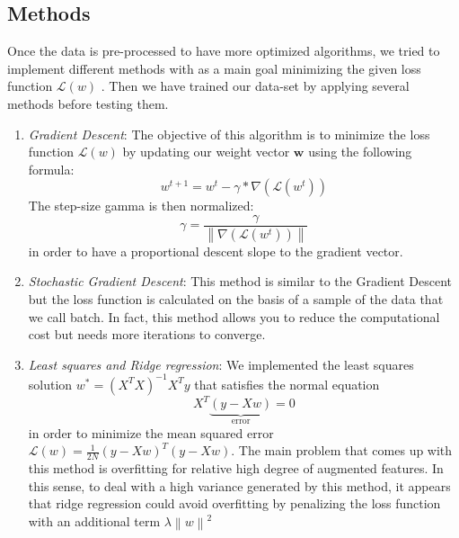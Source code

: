 \documentclass[10pt,conference,compsocconf]{IEEEtran}
\begin{document}
\subsection{Methods}
Once the data is pre-processed to have more optimized algorithms, we tried to implement different methods with as a main goal minimizing the given loss function \( \mathcal{L}( w ) \) .
Then we have trained our data-set by applying several methods before testing them.
\begin{enumerate}
\item  \textit{Gradient Descent}: The objective of this algorithm is to minimize the loss function \( \mathcal{L}( w ) \) by updating our weight vector \( \textbf{w} \) using the following formula: 
\begin{equation}
    w^{t+1} = w^{t} - \gamma*\nabla(\mathcal{L}( w^{t} )) 
\end{equation}
The step-size gamma is then normalized:
\begin{equation} \gamma = \frac{\gamma}{\left\| \nabla(\mathcal{L}( w^{t} ))  \right\|} \end{equation}
in order to have a proportional descent slope to the gradient vector.
\item \textit{Stochastic Gradient Descent}: This method is similar to the Gradient Descent but the loss function is calculated on the basis of a sample of the data that we call batch.
In fact, this method allows you to reduce the computational cost but needs more iterations to converge.
\item \textit{Least squares and Ridge regression}:
We implemented the least squares solution \(  w^{*} = (X^{T}X)^{-1}  X^{T} y \)  that satisfies the normal equation \begin{equation}
 X^{T} \underbrace{( y - Xw )}_{\text{error}} = 0
\end{equation}
in order to  minimize the mean squared error \(  \mathcal{L}(w) = \frac{1}{2N}(y - Xw)^{T}(y-Xw) \).
The main problem that comes up with this method is overfitting for relative high degree of augmented features.
In this sense, to deal with a high variance generated by this method, it appears that ridge regression could avoid overfitting by penalizing the loss function with an additional term 
 \( \lambda \left\| w \right\|^{2} \)


\end{enumerate}
\end{document}
